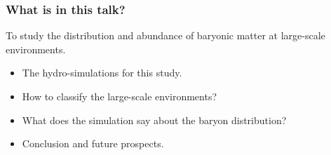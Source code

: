 \documentclass[aspectratio=43]{beamer}
\begin{document}
\begin{frame}
  \frametitle{What is in this talk?}
  To study the distribution and abundance of baryonic matter at large-scale environments.
  \begin{itemize}
    \item<1-> The hydro-simulations for this study.
    \item<2-> How to classify the large-scale environments?
    \item<3-> What does the simulation say about the baryon distribution?
    \item<4-> Conclusion and future prospects.
  \end{itemize}
\end{frame}
\end{document}
